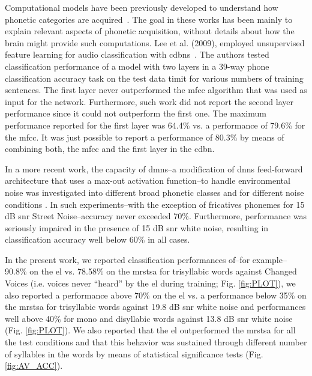 {Computational models have been previously developed to understand how phonetic categories are acquired~\cite{rasanen_2012}. The goal in these works has been mainly to explain relevant aspects of phonetic acquisition, without details about how the brain might provide such computations. 
Lee et al. (2009), employed unsupervised feature learning for audio classification with \glspl{cdbn}~\cite{Lee:2009:UFL:2984093.2984217}.
The authors tested classification performance of a model with two layers in a 39-way phone classification accuracy task on the test data \gls{timit} for various numbers of training sentences.
The first layer never outperformed the \gls{mfcc} algorithm that was used as input for the network.
Furthermore, such work did not report the second layer performance since it could not outperform the first one.
The maximum performance reported for the first layer was 64.4\% vs. a performance of 79.6\% for the \gls{mfcc}.
It was just possible to report a performance of 80.3\% by means of combining both, the \gls{mfcc} and the first layer in the \gls{cdbn}.

In a more recent work, the capacity of \glspl{dmn}--a modification of \glspl{dnn} feed-forward architecture that uses a max-out activation function--to handle environmental noise was investigated into different broad phonetic classes and for different noise conditions \cite{silos_2016}.  In such experiments--with the exception of fricatives phonemes for 15 dB \gls{snr} Street Noise--accuracy never exceeded 70\%. Furthermore, performance was seriously impaired in the presence of 15 dB \gls{snr} white noise, resulting in classification accuracy  well below 60\% in all cases.

In the present work, we reported classification performances of--for example--90.8\% on the \gls{el} vs. 78.58\% on the \gls{mrstsa} for trisyllabic words against Changed Voices (i.e. voices never ``heard'' by the \gls{el} during training; Fig. \ref{fig:PLOT}), we also reported a performance above 70\% on the \gls{el} vs. a performance below 35\% on the \gls{mrstsa} for trisyllabic words against 19.8 dB \gls{snr} white noise and performances well above 40\% for mono and disyllabic words against 13.8 dB \gls{snr} white noise (Fig. \ref{fig:PLOT}). We also reported that the \gls{el} outperformed the \gls{mrstsa} for all the test conditions and that this behavior was sustained through different number of syllables in the words by means of statistical significance tests (Fig. \ref{fig:AV_ACC}).

}

